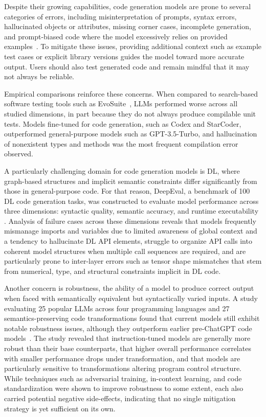 \documentclass[
english,                 %
bibtex,                  %
includeExtraAbstracts, %
]{kththesis}
\numberwithin{listing}{chapter}
\begin{document}
Despite their growing capabilities, code generation models are prone to several categories of errors, including misinterpretation of prompts, syntax errors, hallucinated objects or attributes, missing corner cases, incomplete generation, and prompt-biased code where the model excessively relies on provided examples~\cite{tambon_bugs_2025}. To mitigate these issues, providing additional context such as example test cases or explicit library versions guides the model toward more accurate output. Users should also test generated code and remain mindful that it may not always be reliable.

Empirical comparisons reinforce these concerns. When compared to search-based software testing tools such as EvoSuite~\cite{siddiq_using_2024}, \glspl{LLM} performed worse across all studied dimensions, in part because they do not always produce compilable unit tests. Models fine-tuned for code generation, such as Codex and StarCoder, outperformed general-purpose models such as \gls{GPT}-3.5-Turbo, and hallucination of nonexistent types and methods was the most frequent compilation error observed.

A particularly challenging domain for code generation models is \gls{DL}, where graph-based structures and implicit semantic constraints differ significantly from those in general-purpose code. For that reason, \gls{DeepEval}, a benchmark of 100 \gls{DL} code generation tasks, was constructed to evaluate model performance across three dimensions: syntactic quality, semantic accuracy, and runtime executability \cite{ma_how_2026}. Analysis of failure cases across these dimensions reveals that models frequently mismanage imports and variables due to limited awareness of global context and a tendency to hallucinate \gls{DL} \gls{API} elements, struggle to organize \gls{API} calls into coherent model structures when multiple call sequences are required, and are particularly prone to inter-layer errors such as tensor shape mismatches that stem from numerical, type, and structural constraints implicit in \gls{DL} code.

Another concern is robustness, the ability of a model to produce correct output when faced with semantically equivalent but syntactically varied inputs. A study evaluating 25 popular \glspl{LLM} across four programming languages and 27 semantics-preserving code transformations found that current models still exhibit notable robustness issues, although they outperform earlier pre-Chat\gls{GPT} code models~\cite{liu_robustness_2026}. The study revealed that instruction-tuned models are generally more robust than their base counterparts, that higher overall performance correlates with smaller performance drops under transformation, and that models are particularly sensitive to transformations altering program control structure. While techniques such as adversarial training, in-context learning, and code standardization were shown to improve robustness to some extent, each also carried potential negative side-effects, indicating that no single mitigation strategy is yet sufficient on its own.
\end{document}
